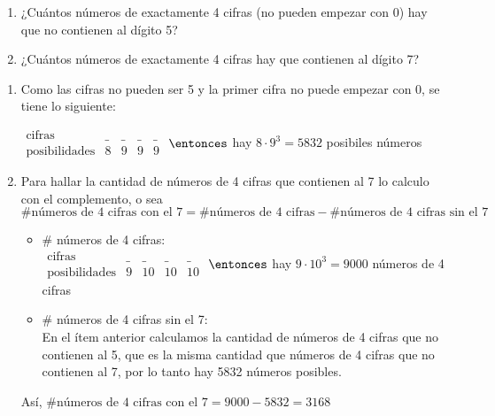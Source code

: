 \ejercicio

\begin{enumerate}[label=\roman*)]
  \item ¿Cuántos números de exactamente 4 cifras (no pueden empezar con 0) hay que no contienen al dígito 5?
  \item ¿Cuántos números de exactamente 4 cifras hay que contienen al dígito 7?
\end{enumerate}

\separadorCorto

\begin{enumerate}[label=\roman*)]
  \item

        Como las cifras no pueden ser 5 y la primer cifra no puede empezar con 0, se tiene lo siguiente:

        $
          \begin{array}{r|cccc}
            \text{cifras}        & \_ & \_ & \_ & \_ \\
            \text{posibilidades} & 8               & 9               & 9               & 9
          \end{array}
        $
        $\entonces$ hay $8 \cdot 9^3 = 5832$ posibiles números

  \item Para hallar la cantidad de números de 4 cifras que contienen al 7 lo calculo con el complemento, o sea\\

        $\# \text{números de 4 cifras con el 7} = \# \text{números de 4 cifras} - \# \text{números de 4 cifras sin el 7}$\\

        \begin{itemize}
          \item \# números de 4 cifras:\\

                $
                  \begin{array}{r|cccc}
                    \text{cifras}        & \_ & \_ & \_ & \_ \\
                    \text{posibilidades} & 9  & 10 & 10 & 10
                  \end{array}
                $
                $\entonces$ hay $9 \cdot 10^3 = 9000$ números de 4 cifras

          \item \# números de 4 cifras sin el 7:\\
                En el ítem anterior calculamos la cantidad de números de 4 cifras que no contienen al 5, que es la misma cantidad que números de 4 cifras que no contienen al 7, por lo tanto hay 5832 números posibles.
        \end{itemize}

        Así, $\# \text{números de 4 cifras con el 7} = 9000 - 5832 = 3168$
\end{enumerate}
